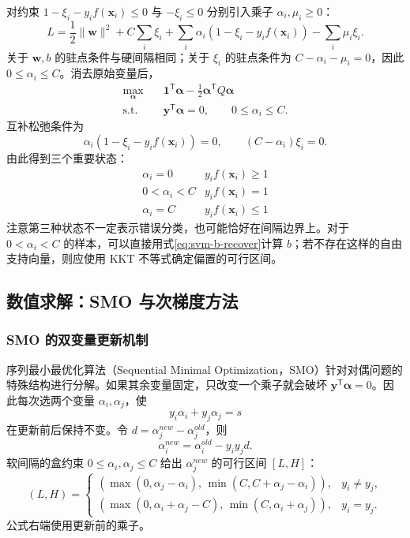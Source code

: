 对约束 $1-\xi_i-y_if(\boldsymbol x_i)\leq0$ 与 $-\xi_i\leq0$ 分别引入乘子 $\alpha_i,\mu_i\geq0$：
\[
L=\frac12\|\boldsymbol w\|^2+C\sum_i\xi_i
+\sum_i\alpha_i(1-\xi_i-y_if(\boldsymbol x_i))
-\sum_i\mu_i\xi_i.
\]
关于 $\boldsymbol w,b$ 的驻点条件与硬间隔相同；关于 $\xi_i$ 的驻点条件为
$C-\alpha_i-\mu_i=0$，因此 $0\leq\alpha_i\leq C$。消去原始变量后，
\begin{equation}\label{eq:svm-soft-dual}
\begin{aligned}
\max_{\boldsymbol\alpha}\quad&
\boldsymbol1^{\mathsf T}\boldsymbol\alpha-\frac12\boldsymbol\alpha^{\mathsf T}Q\boldsymbol\alpha\\
\text{s.t.}\quad&\boldsymbol y^{\mathsf T}\boldsymbol\alpha=0,\qquad 0\leq\alpha_i\leq C.
\end{aligned}
\end{equation}
互补松弛条件为
\[
\alpha_i(1-\xi_i-y_if(\boldsymbol x_i))=0,\qquad (C-\alpha_i)\xi_i=0.
\]
由此得到三个重要状态：
\[
\begin{array}{c|c}
\alpha_i=0 & y_if(\boldsymbol x_i)\geq1\\
0<\alpha_i<C & y_if(\boldsymbol x_i)=1\\
\alpha_i=C & y_if(\boldsymbol x_i)\leq1
\end{array}
\]
注意第三种状态不一定表示错误分类，也可能恰好在间隔边界上。对于 $0<\alpha_i<C$ 的样本，可以直接用式\eqref{eq:svm-b-recover}计算 $b$；若不存在这样的自由支持向量，则应使用 KKT 不等式确定偏置的可行区间。

\subsection{数值求解：SMO 与次梯度方法}

\subsubsection{SMO 的双变量更新机制}

序列最小最优化算法（Sequential Minimal Optimization，SMO）针对对偶问题的特殊结构进行分解\cite[第7章]{lihang2019}。如果其余变量固定，只改变一个乘子就会破坏 $\boldsymbol y^{\mathsf T}\boldsymbol\alpha=0$。因此每次选两个变量 $\alpha_i,\alpha_j$，使
\[
y_i\alpha_i+y_j\alpha_j=s
\]
在更新前后保持不变。令 $d=\alpha_j^{new}-\alpha_j^{old}$，则
\[
\alpha_i^{new}=\alpha_i^{old}-y_i y_jd.
\]
软间隔的盒约束 $0\leq\alpha_i,\alpha_j\leq C$ 给出 $\alpha_j^{new}$ 的可行区间 $[L,H]$：
\[
(L,H)=
\begin{cases}
(\max(0,\alpha_j-\alpha_i),\,\min(C,C+\alpha_j-\alpha_i)),&y_i\ne y_j,\\
(\max(0,\alpha_i+\alpha_j-C),\,\min(C,\alpha_i+\alpha_j)),&y_i=y_j.
\end{cases}
\]
公式右端使用更新前的乘子。

